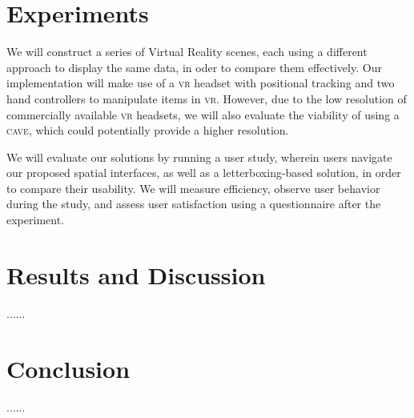 \documentclass{tufte-book} %
\begin{document}

\chapter{Experiments}
\label{ch:experiments}

We will construct a series of Virtual Reality scenes, each using a different approach to display the same data, in oder to compare them effectively. Our implementation will make use of a \textsc{vr} headset with positional tracking and two hand controllers to manipulate items in \textsc{vr}. However, due to the low resolution of commercially available \textsc{vr} headsets, we will also evaluate the viability of using a \textsc{cave}, which could potentially provide a higher resolution.

We will evaluate our solutions by running a user study, wherein users navigate our proposed spatial interfaces, as well as a letterboxing-based solution, in order to compare their usability. We will measure efficiency, observe user behavior during the study, and assess user satisfaction using a questionnaire after the experiment.



\chapter{Results and Discussion}
\label{ch:results-and-discussion}


......


\chapter{Conclusion}
\label{ch:conclusion}


......


\backmatter




\printindex %
\end{document}
